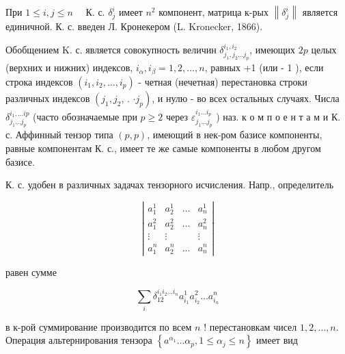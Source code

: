 \documentclass[10pt]{article}
\begin{document}
При $1 \leqslant i, j \leqslant n \quad$ К. с. $\delta_{j}^{i}$ имеет $n^{2}$ компонент, матрица к-рых $\left\|\delta_{j}^{i}\right\|$ является единичной. К. с. введен Л. Кронекером (L. Kronecker, 1866).



Обобщением K. с. является совокупность величин $\delta_{j_{1}, j_{2} \ldots j_{p}}^{i_{1}, i_{2}}$, имеющих $2 p$ целых (верхних и нижних) индексов, $i_{\alpha}, i_{\beta}=1,2, \ldots, n$, равных +1 (или - 1 ), если строка индексов $\left(i_{1}, i_{2}, \ldots, i_{p}\right)$ - четная (нечетная) перестановка строки различных индексов $\left(j_{1}, j_{2}\right.$, . $\left.\cdot j_{p}\right)$, и нулю - во всех остальных случаях. Числа $\delta_{j_{1} \ldots j_{p}}^{i_{1}, \ldots i p}$ (часто обозначаемые при $p \geqslant 2$ через $\varepsilon_{j_{1} \ldots j_{p}}^{i_{1} \ldots i_{p}}$ ) наз. к о м п о е н т а м и К. с. Аффинный тензор типа $(p, p)$, имеющий в нек-ром базисе компоненты, равные компонентам К. с., имеет те же самые компоненты в любом другом базисе.



К. с. удобен в различных задачах тензорного исчисления. Напр., определитель



\[

\left|\begin{array}{cccc}

a_{1}^{1} & a_{2}^{1} & \ldots & a_{n}^{1} \\

a_{1}^{2} & a_{2}^{2} & \ldots & a_{n}^{2} \\

\vdots & \vdots & & \vdots \\

a_{1}^{n} & a_{2}^{n} & \ldots & a_{n}^{n}

\end{array}\right|

\]



равен сумме



\[

\sum_{i} \delta_{12}^{i_{1} i_{2} \ldots i_{n}} a_{i_{1}}^{1} a_{i_{2}}^{2} \ldots a_{i_{n}}^{n}

\]



в к-рой суммирование производится по всем $n$ ! перестановкам чисел $1,2, \ldots, n$. Операция альтернирования тензора $\left\{a^{\alpha_{1}} \ldots \alpha_{p}, 1 \leqslant \alpha_{j} \leqslant n\right\}$ имеет вид
\end{document}
